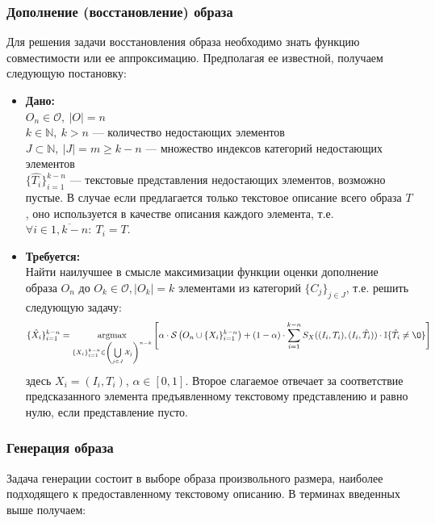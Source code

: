 \documentclass[a4paper,12pt]{article}
\DeclareMathOperator*{\argmax}{argmax}
\begin{document}
			\subsubsection{Дополнение (восстановление) образа}
				Для решения задачи восстановления образа необходимо знать функцию совместимости или ее аппроксимацию. Предполагая ее известной, получаем следующую постановку:
				\begin{itemize}
					\item \textbf{Дано:}\\
					$O_n\in\mathcal{O}, ~|O| = n$ \\
					$k \in \mathbb{N}, ~k> n$ --- количество недостающих элементов\\
					$J\subset\mathbb{N},~|J| = m\geqslant k-n$ --- множество индексов категорий недостающих элементов\\
					$\{\hat{T_i}\}_{i=1}^{k-n}$ --- текстовые представления недостающих элементов, возможно пустые. В случае если предлагается только текстовое описание всего образа $T$, оно используется в качестве описания каждого элемента, т.е. $\forall i \in \overline{1,k-n}: ~T_i = T$.
					
					\item \textbf{Требуется:}\\
					Найти наилучшее в смысле максимизации функции оценки дополнение образа $O_n$ до $O_k\in\mathcal{O}, |O_k|=k$ элементами из категорий $\{C_j\}_{j\in J}$, т.е. решить следующую задачу:
					$$\{\hat{X_i}\}_{i=1}^{k-n}= \argmax_{\{X_i\}_{i=1}^{k-n}\in\left(\bigcup\limits_{j\in J}\mathcal{X}_j\right)^{n-k}} \left[\alpha \cdot \mathcal{S}\left(O_n\cup\{X_i\}_{i=1}^{k-n}\right) + (1-\alpha) \cdot \sum\limits_{i=1}^{k-n} S_X((I_i, T_i), (I_i, \hat{T_i}))\cdot\mathbb{I}\{\hat{T_i}\neq\O\}  \right]$$				
					здесь $X_i = (I_i, T_i)$, $\alpha\in[0,1]$. Второе слагаемое отвечает за соответствие предсказанного элемента предъявленному текстовому представлению и равно нулю, если представление пусто.
				\end{itemize}
			\subsubsection{Генерация образа}
				Задача генерации состоит в выборе образа произвольного размера, наиболее подходящего к предоставленному текстовому описанию. В терминах введенных выше получаем:
			
\end{document}
